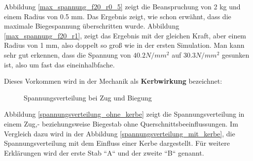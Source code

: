 	Abbildung \ref{max_spannung_f20_r0_5} zeigt die Beanspruchung von 2 kg und einem Radius von 0.5 mm.
	Das Ergebnis zeigt, wie schon erwähnt, dass die maximale Biegespannung überschritten wurde.
	Abbildung \ref{max_spannung_f20_r1}, zeigt das Ergebnis mit der gleichen Kraft, aber einem Radius von 1 mm, also doppelt so groß wie in der ersten Simulation.
	Man kann sehr gut erkennen, dass die Spannung von $40.2 N/mm^{2}$ auf $30.3 N/mm^{2}$ gesunken ist, also um fast das eineinhalbfache.

	Dieses Vorkommen wird in der Mechanik als \textbf{Kerbwirkung} bezeichnet:

			\begin{figure}[H]
				\begin{centering}
				\par\end{centering}
				\caption[Spannungsverteilung bei Zug und Biegung]{Spannungsverteilung bei Zug und Biegung\cite{spannungsverteilung}}
				\label{spannungsverteilung_ohne_und_mit_kerbe}
			\end{figure}

	Abbildung \ref{spannungsverteilung_ohne_kerbe} zeigt die Spannungsverteilung in einem Zug,- beziehungsweise Biegestab ohne Querschnittsbeeinflussungen.
	Im Vergleich dazu wird in der Abbildung \ref{spannungsverteilung_mit_kerbe}, die Spannungsverteilung mit dem Einfluss einer Kerbe dargestellt.
	Für weitere Erklärungen wird der erste Stab “A“ und der zweite “B“ genannt.

